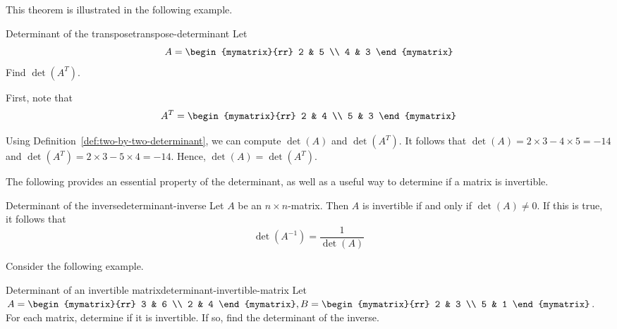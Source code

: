 This theorem is illustrated in the following example.

\begin{example}{Determinant of the transpose}{transpose-determinant}
  Let
  \begin{equation*}
    A
    =
    \begin{mymatrix}{rr}
      2 & 5 \\
      4 & 3
    \end{mymatrix}
  \end{equation*}
  Find $\det(A^T)$.
\end{example}

\begin{solution}
  First, note that
  \begin{equation*}
    A^{T}
    =
    \begin{mymatrix}{rr}
      2 & 4 \\
      5 & 3
    \end{mymatrix}
  \end{equation*}

  Using Definition~\ref{def:two-by-two-determinant}, we can compute
  $\det(A)$ and $\det(A^T)$. It follows that
  $\det(A) = 2 \times 3 - 4 \times 5 = -14$ and
  $\det(A^T) = 2 \times 3 - 5 \times 4 = -14$.  Hence,
  $\det(A) = \det(A^T)$.
\end{solution}

The following provides an essential property of the determinant, as
well as a useful way to determine if a matrix is invertible.

\begin{theorem}{Determinant of the inverse}{determinant-inverse}
  Let $A$ be an $n \times n$-matrix. Then $A$ is invertible if and
  only if $\det(A) \neq 0$. If this is true, it follows that
  \begin{equation*}
    \det(A^{-1}) = \frac{1}{\det(A)}
  \end{equation*}
\end{theorem}

Consider the following example.

\begin{example}{Determinant of an invertible matrix}{determinant-invertible-matrix}
  Let $A = \begin{mymatrix}{rr}
    3 & 6 \\
    2 & 4
  \end{mymatrix}, B = \begin{mymatrix}{rr}
    2 & 3 \\
    5 & 1
  \end{mymatrix}$. For each matrix, determine if it is invertible. If
  so, find the determinant of the inverse.
\end{example}

